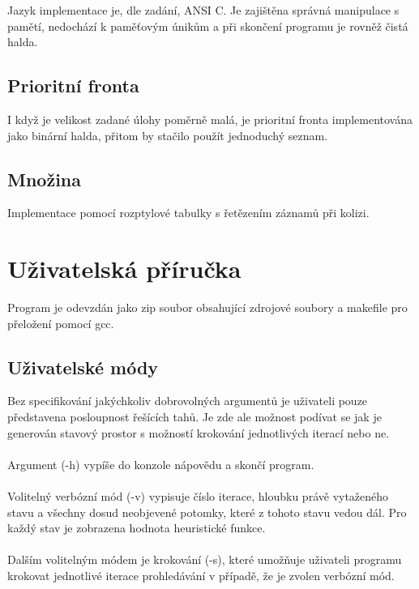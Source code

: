 \documentclass[12pt]{article}
\begin{document}
Jazyk implementace je, dle zadání, ANSI C. Je zajištěna správná manipulace s
pamětí, nedochází k paměťovým únikům a při skončení programu je rovněž čistá
halda.

\subsection{Prioritní fronta}
I když je velikost zadané úlohy poměrně malá, je prioritní fronta
implementována jako binární halda, přitom by stačilo použít jednoduchý seznam.

\subsection{Množina}
Implementace pomocí rozptylové tabulky s řetězením záznamů při kolizi.

\clearpage
\section{Uživatelská příručka}
Program je odevzdán jako zip soubor obsahující zdrojové soubory a makefile pro
přeložení pomocí gcc.


\subsection{Uživatelské módy}
Bez specifikování jakýchkoliv dobrovolných argumentů je uživateli pouze
představena posloupnost řešících tahů. Je zde ale možnost podívat se jak je
generován stavový prostor s možností krokování jednotlivých iterací nebo ne.

\paragraph{}
Argument (-h) vypíše do konzole nápovědu a skončí program.

\paragraph{}
Volitelný verbózní mód (-v) vypisuje číslo iterace, hloubku právě vytaženého
stavu a všechny dosud neobjevené potomky, které z tohoto stavu vedou dál. Pro
každý stav je zobrazena hodnota heuristické funkce.

\paragraph{}
Dalším volitelným módem je krokování (-s), které umožňuje uživateli programu
krokovat jednotlivé iterace prohledávání v případě, že je zvolen verbózní mód.
\end{document}
